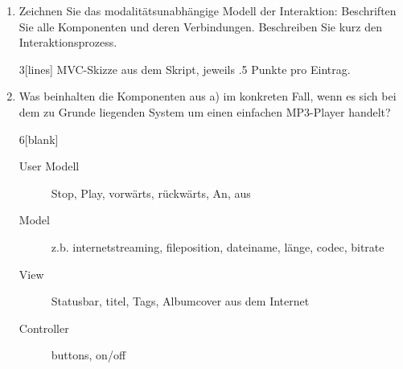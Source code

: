 	
\begin{enumerate}
\item Zeichnen Sie das modalitätsunabhängige Modell der Interaktion: Beschriften
Sie alle Komponenten und deren Verbindungen. Beschreiben Sie kurz den
Interaktionsprozess.

\begin{solution}{3}[lines]
MVC-Skizze aus dem Skript, jeweils .5 Punkte pro Eintrag.
\end{solution}

\item Was beinhalten die Komponenten aus a) im konkreten Fall, wenn es sich bei
dem zu Grunde liegenden System um einen einfachen MP3-Player handelt?

\begin{solution}{6}[blank]
\begin{description} 
\item[User Modell] Stop, Play, vorwärts, rückwärts, An, aus
\item[Model] z.b. internetstreaming, fileposition, dateiname, länge, codec,
bitrate
\item[View] Statusbar, titel, Tags, Albumcover aus dem Internet 
\item[Controller] buttons, on/off
\end{description}
\end{solution}

\end{enumerate}